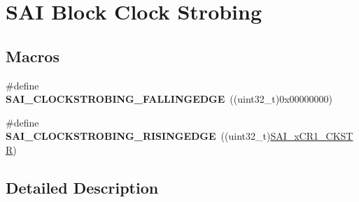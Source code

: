 \hypertarget{group___s_a_i___block___clock___strobing}{}\section{S\+AI Block Clock Strobing}
\label{group___s_a_i___block___clock___strobing}
\subsection*{Macros}
\begin{DoxyCompactItemize}
\item 
\#define {\bfseries S\+A\+I\+\_\+\+C\+L\+O\+C\+K\+S\+T\+R\+O\+B\+I\+N\+G\+\_\+\+F\+A\+L\+L\+I\+N\+G\+E\+D\+GE}~((uint32\+\_\+t)0x00000000)\hypertarget{group___s_a_i___block___clock___strobing_ga37724258b51e49bb6a5e6508982b4c33}{}\label{group___s_a_i___block___clock___strobing_ga37724258b51e49bb6a5e6508982b4c33}

\item 
\#define {\bfseries S\+A\+I\+\_\+\+C\+L\+O\+C\+K\+S\+T\+R\+O\+B\+I\+N\+G\+\_\+\+R\+I\+S\+I\+N\+G\+E\+D\+GE}~((uint32\+\_\+t)\hyperlink{group___peripheral___registers___bits___definition_gae2c0c68bf65088e0ddeb9a1759aff3f7}{S\+A\+I\+\_\+x\+C\+R1\+\_\+\+C\+K\+S\+TR})\hypertarget{group___s_a_i___block___clock___strobing_gab25e505ec07c0b252e14c05f8662b75c}{}\label{group___s_a_i___block___clock___strobing_gab25e505ec07c0b252e14c05f8662b75c}

\end{DoxyCompactItemize}


\subsection{Detailed Description}
